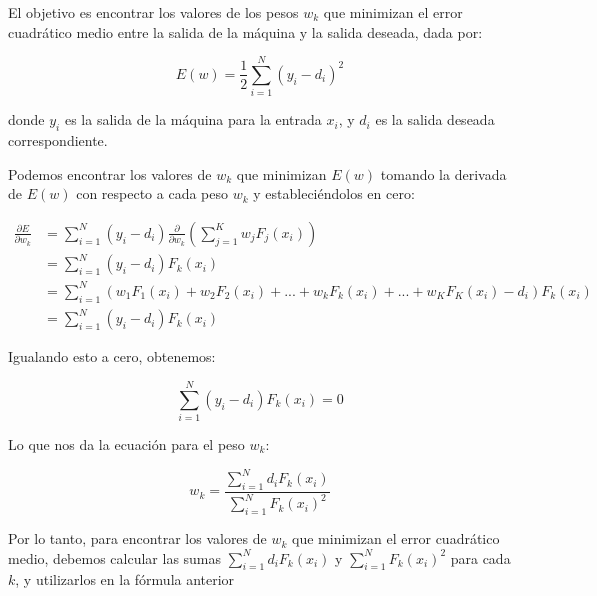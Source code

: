 \documentclass{article}
\theoremstyle{mytheoremstyle}
\theoremstyle{mytheoremstyle}
\theoremstyle{myproblemstyle}
\begin{document}
El objetivo es encontrar los valores de los pesos $w_k$ que minimizan el error cuadrático medio entre la salida de la máquina y la salida deseada, dada por:

\begin{equation*}
  E(w) = \frac{1}{2}\sum_{i=1}^{N}(y_i - d_i)^2
\end{equation*}

donde $y_i$ es la salida de la máquina para la entrada $x_i$, y $d_i$ es la salida deseada correspondiente.

Podemos encontrar los valores de $w_k$ que minimizan $E(w)$ tomando la derivada de $E(w)$ con respecto a cada peso $w_k$ y estableciéndolos en cero:

\begin{align*}
  \frac{\partial E}{\partial w_k} & = \sum_{i=1}^{N}(y_i - d_i)\frac{\partial}{\partial w_k}\left(\sum_{j=1}^{K}w_jF_j(x_i)\right)    \\
                                  & = \sum_{i=1}^{N}(y_i - d_i)F_k(x_i)                                                               \\
                                  & = \sum_{i=1}^{N}(w_1F_1(x_i) + w_2F_2(x_i) + ... + w_kF_k(x_i) + ... + w_KF_K(x_i) - d_i)F_k(x_i) \\
                                  & = \sum_{i=1}^{N}(y_i - d_i)F_k(x_i)
\end{align*}

Igualando esto a cero, obtenemos:

\begin{equation*}
  \sum_{i=1}^{N}(y_i - d_i)F_k(x_i) = 0
\end{equation*}

Lo que nos da la ecuación para el peso $w_k$:

\begin{equation*}
  w_k = \frac{\sum_{i=1}^{N}d_iF_k(x_i)}{\sum_{i=1}^{N}F_k(x_i)^2}
\end{equation*}

Por lo tanto, para encontrar los valores de $w_k$ que minimizan el error cuadrático medio, debemos calcular las sumas $\sum_{i=1}^{N}d_iF_k(x_i)$ y $\sum_{i=1}^{N}F_k(x_i)^2$ para cada $k$, y utilizarlos en la fórmula anterior
\end{document}

